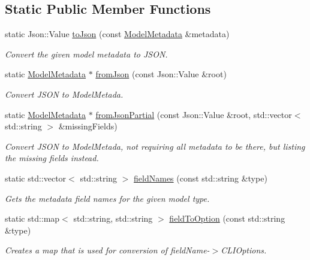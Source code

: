 \subsection*{Static Public Member Functions}
\begin{DoxyCompactItemize}
\item 
static Json\+::\+Value \hyperlink{group___classification_module_ga5ec8400c84d8e2898a2c6c68c48b4bad}{to\+Json} (const \hyperlink{classdg_1_1deepcore_1_1classification_1_1_model_metadata}{Model\+Metadata} \&metadata)
\begin{DoxyCompactList}\small\item\em Convert the given model metadata to J\+S\+ON. \end{DoxyCompactList}\item 
static \hyperlink{classdg_1_1deepcore_1_1classification_1_1_model_metadata}{Model\+Metadata} $\ast$ \hyperlink{group___classification_module_ga330b066361d952da97e7b1e8b2860c5f}{from\+Json} (const Json\+::\+Value \&root)
\begin{DoxyCompactList}\small\item\em Convert J\+S\+ON to Model\+Metada. \end{DoxyCompactList}\item 
static \hyperlink{classdg_1_1deepcore_1_1classification_1_1_model_metadata}{Model\+Metadata} $\ast$ \hyperlink{group___classification_module_ga09b81c4a7b02f8a6fc24a1115b6a29f9}{from\+Json\+Partial} (const Json\+::\+Value \&root, std\+::vector$<$ std\+::string $>$ \&missing\+Fields)
\begin{DoxyCompactList}\small\item\em Convert J\+S\+ON to Model\+Metada, not requiring all metadata to be there, but listing the missing fields instead. \end{DoxyCompactList}\item 
static std\+::vector$<$ std\+::string $>$ \hyperlink{group___classification_module_gaa1a0da4f9b0c3e8a98ef29894910bc8d}{field\+Names} (const std\+::string \&type)
\begin{DoxyCompactList}\small\item\em Gets the metadata field names for the given model type. \end{DoxyCompactList}\item 
static std\+::map$<$ std\+::string, std\+::string $>$ \hyperlink{group___classification_module_gafb0eba5c57e9b1b1aa4c806c038c4515}{field\+To\+Option} (const std\+::string \&type)
\begin{DoxyCompactList}\small\item\em Creates a map that is used for conversion of field\+Name-\/$>$C\+L\+I\+Options. \end{DoxyCompactList}\end{DoxyCompactItemize}
